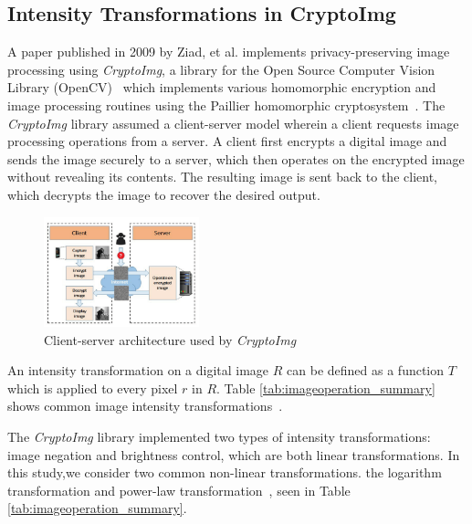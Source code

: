 \subsection{Intensity Transformations in CryptoImg}
A paper published in 2009 by Ziad, et al. implements privacy-preserving image processing using \textit{CryptoImg}, a library for the Open Source Computer Vision Library (OpenCV)~\cite{bradski_opencv_2000} which implements various homomorphic encryption and image processing routines using the Paillier homomorphic cryptosystem~\cite{ziad_cryptoimg:_2016}. The \textit{CryptoImg} library assumed a client-server model wherein a client requests image processing operations from a server. A client first encrypts a digital image and sends the image securely to a server, which then operates on the encrypted image without revealing its contents. The resulting image is sent back to the client, which decrypts the image to recover the desired output.
\begin{figure}[!ht]
    \centering
    \includegraphics[width=0.4\textwidth]{figures/ClientServerModel.png}
    \caption{Client-server architecture used by \textit{CryptoImg} \cite{ziad_cryptoimg:_2016}}
    \label{fig:clientserver}
\end{figure}

An intensity transformation on a digital image $R$ can be defined as a function $T$ which is applied to every pixel $r$ in $R$. Table \ref{tab:imageoperation_summary} shows common image intensity transformations~\cite{gonzalez_digital_2008}.

The \textit{CryptoImg} library implemented two types of intensity transformations: image negation and brightness control, which are both linear transformations. In this study,we consider two common non-linear transformations. the logarithm transformation and power-law transformation~\cite{gonzalez_digital_2008}, seen in Table \ref{tab:imageoperation_summary}.

